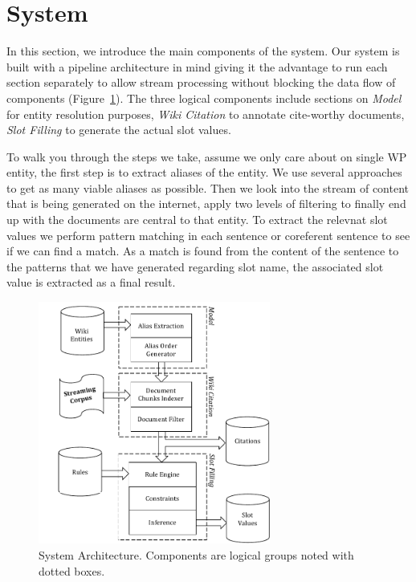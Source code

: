 
\section{System}

In this section, we introduce the main components of the system. Our system is built with a pipeline architecture in mind giving it the advantage to run each section separately to allow stream processing without blocking the data flow of components (Figure~\ref{fig:system}). The three logical components include sections on \textit{Model} for entity resolution purposes, \textit{Wiki Citation} to annotate cite-worthy documents, \textit{Slot Filling} to generate the actual slot values.


To walk you through the steps we take, assume we only care about on single WP entity, the first step is to extract aliases of the entity. We use several approaches to get as many viable aliases as possible. Then we look into the stream of content that is being generated on the internet, apply two levels of filtering to finally end up with the documents are central to that entity. To extract the relevnat slot values we perform pattern matching in each sentence or coreferent sentence to see if we can find a match. As a match is found from the content of the sentence to the patterns that we have generated regarding slot name, the associated slot value is extracted as a final result.


\begin{figure}
  \centering
  \includegraphics[width=3in]{./images/System_Diagram_with_model_Vertical-crop.pdf}
  \vspace*{-.1in} 
  \caption{System Architecture.
  Components are logical groups noted with dotted boxes.}
  \label{fig:system}
  \vspace*{-.2in}
\end{figure}



